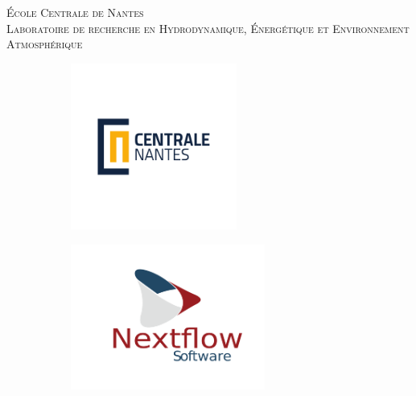 \documentclass[11pt, a4paper, oneside, openany]{book}
\begin{document}
\sloppy
\frontmatter
\begin{titlepage}
\centering
{\large\textsc{École Centrale de Nantes}}\\
\textsc{Laboratoire de recherche en Hydrodynamique, Énergétique et Environnement Atmosphérique}\\
\vspace{0.5cm}
\begin{figure}[!ht]
\centering
\begin{subfigure}{.5\textwidth}
\begin{flushleft}
\includegraphics[trim={2.75cm 6cm 2.75cm 6cm},clip,width=0.6\textwidth]{LogoCN_Q.pdf}
\end{flushleft}
\end{subfigure}%
\begin{subfigure}{.5\textwidth}
\begin{flushright}
\includegraphics[width=0.7\textwidth]{logo_Nextflow_Software.pdf}
\end{flushright}

\end{subfigure}
\end{figure}
\end{titlepage}
\end{document}
